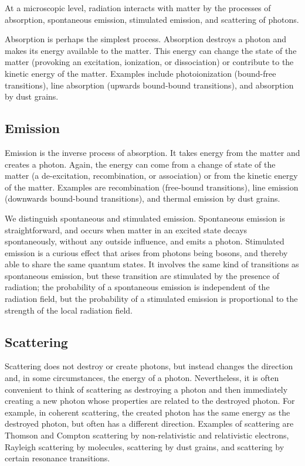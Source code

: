 At a microscopic level, radiation interacts with matter by the processes of absorption,
spontaneous emission, stimulated emission, and scattering of photons.

Absorption is perhaps the simplest process. Absorption
destroys a photon and makes its energy available to the
matter. This energy can change the state of the matter (provoking an excitation, ionization, or dissociation) or
contribute to the kinetic energy of the matter. Examples include
photoionization (bound-free transitions), line absorption
(upwards bound-bound transitions), and absorption by dust
grains.

\newslide

\subsection{Emission}

Emission is the inverse process of absorption. It takes
energy from the matter and creates a photon. Again, the energy can come from
a change of state of the matter (a de-excitation, recombination, or association) or from the kinetic energy of the matter. Examples are
recombination (free-bound transitions), line emission
(downwards bound-bound transitions), and thermal emission by
dust grains. 

We distinguish spontaneous and stimulated
emission. Spontaneous emission is straightforward, and
occurs when matter in an excited state decays spontaneously,
without any outside influence, and emits a photon.
Stimulated emission is a curious effect that arises from
photons being bosons, and thereby able to share the same
quantum states. It involves the same kind of transitions as
spontaneous emission, but these transition are stimulated by
the presence of radiation; the probability of a spontaneous
emission is independent of the radiation field, but the
probability of a stimulated emission is proportional to the
strength of the local radiation field. 

\newslide

\subsection{Scattering}

Scattering does not destroy or create photons, but instead
changes the direction and, in some circumstances, the energy
of a photon. Nevertheless, it is often convenient to think of scattering as destroying a photon and then immediately creating a new photon whose properties are related to the destroyed photon. For example, in coherent scattering, the created photon has the same energy as the destroyed photon, but often has a different direction. Examples of scattering are Thomson and Compton
scattering by non-relativistic and relativistic electrons,
Rayleigh scattering by molecules, scattering by dust grains,
and scattering by certain resonance transitions.

